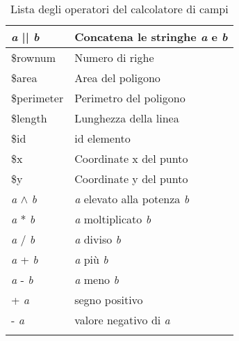 \begin{center}
{\begin{longtable}{|p{4cm}|p{10cm}|}
\hline \textit{a} || \textit{b} & Concatena le stringhe \textit{a} e \textit{b} \\
\hline \$rownum & Numero di righe \\
\hline \$area & Area del poligono \\
\hline \$perimeter & Perimetro del poligono \\
\hline \$length & Lunghezza della linea \\
\hline \$id & id elemento \\
\hline \$x & Coordinate x del punto \\
\hline \$y & Coordinate y del punto \\
\hline \textit{a} $\wedge$ \textit{b} & \textit{a} elevato alla potenza \textit{b} \\
\hline \textit{a} * \textit{b} & \textit{a} moltiplicato \textit{b} \\
\hline \textit{a} / \textit{b} & \textit{a} diviso \textit{b} \\
\hline \textit{a} + \textit{b} & \textit{a} più \textit{b} \\
\hline \textit{a} - \textit{b} & \textit{a} meno \textit{b} \\
\hline + \textit{a} & segno positivo \\
\hline - \textit{a} & valore negativo di \textit{a} \\
\hline 
\caption{Lista degli operatori del calcolatore di campi}\\
\end{longtable}}
\end{center}